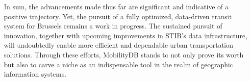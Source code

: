 \documentclass[12pt]{report}
\begin{document}
	In sum, the advancements made thus far are significant and indicative of a positive trajectory. Yet, the pursuit of a fully optimized, data-driven transit system for Brussels remains a work in progress. The sustained pursuit of innovation, together with upcoming improvements in STIB's data infrastructure, will undoubtedly enable more efficient and dependable urban transportation solutions. Through these efforts, MobilityDB stands to not only prove its worth but also to carve a niche as an indispensable tool in the realm of geographic information systems.
	
	

\printbibliography	
\end{document}
